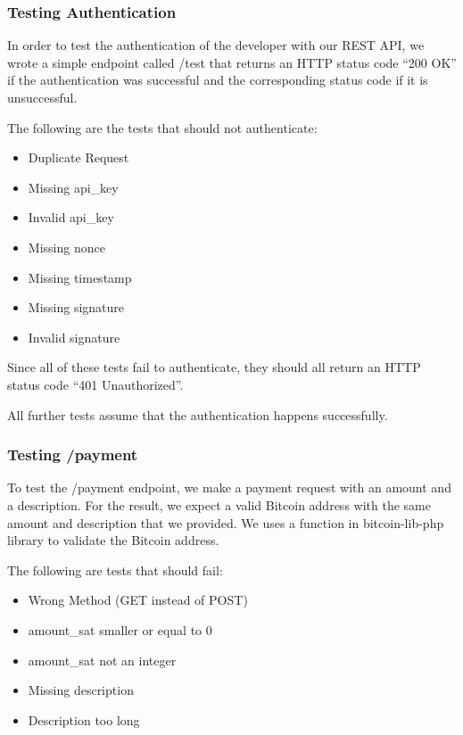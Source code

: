 \subsubsection{Testing Authentication}
In order to test the authentication of the developer with our REST API, we wrote a simple endpoint called /test that returns an HTTP status code ``200 OK'' if the authentication was successful and the corresponding status code if it is unsuccessful.



The following are the tests that should not authenticate:

\begin{itemize}
	\item Duplicate Request
	\item Missing api\_key
	\item Invalid api\_key
	\item Missing nonce
	\item Missing timestamp
	\item Missing signature
	\item Invalid signature
\end{itemize}

Since all of these tests fail to authenticate, they should all return an HTTP status code ``401 Unauthorized''.

All further tests assume that the authentication happens successfully.

\subsubsection{Testing /payment}

To test the /payment endpoint, we make a payment request with an amount and a description. For the result, we expect a valid Bitcoin address with the same amount and description that we provided. We uses a function in bitcoin-lib-php library to validate the Bitcoin address. 

The following are tests that should fail:

\begin{itemize}
	\item Wrong Method (GET instead of POST)
	\item amount\_sat smaller or equal to 0
	\item amount\_sat not an integer
	\item Missing description
	\item Description too long
\end{itemize}

